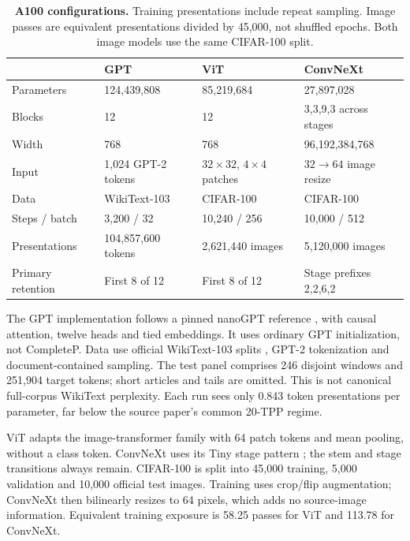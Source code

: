 \documentclass[10pt,letterpaper]{article}
\begin{document}
\begin{table}[h]
\centering\small
\caption{\textbf{A100 configurations.} Training presentations include repeat sampling. Image passes are equivalent presentations divided by 45,000, not shuffled epochs. Both image models use the same CIFAR-100 split.}
\label{tab:models}
\begin{tabularx}{\linewidth}{@{}lXXX@{}}\toprule
 & GPT & ViT & ConvNeXt\\\midrule
Parameters & 124,439,808 & 85,219,684 & 27,897,028\\
Blocks & 12 & 12 & 3,3,9,3 across stages\\
Width & 768 & 768 & 96,192,384,768\\
Input & 1,024 GPT-2 tokens & $32\!\times\!32$, $4\!\times\!4$ patches & $32\to64$ image resize\\
Data & WikiText-103 & CIFAR-100 & CIFAR-100\\
Steps / batch & 3,200 / 32 & 10,240 / 256 & 10,000 / 512\\
Presentations & 104,857,600 tokens & 2,621,440 images & 5,120,000 images\\
Primary retention & First 8 of 12 & First 8 of 12 & Stage prefixes 2,2,6,2\\\bottomrule
\end{tabularx}
\end{table}

The GPT implementation follows a pinned nanoGPT reference \citep{nanogpt}, with causal attention, twelve heads and tied embeddings. It uses ordinary GPT initialization, not CompleteP. Data use official WikiText-103 splits \citep{wikitext}, GPT-2 tokenization and document-contained sampling. The test panel comprises 246 disjoint windows and 251,904 target tokens; short articles and tails are omitted. This is not canonical full-corpus WikiText perplexity. Each run sees only 0.843 token presentations per parameter, far below the source paper's common 20-TPP regime.

ViT adapts the image-transformer family \citep{vit} with 64 patch tokens and mean pooling, without a class token. ConvNeXt uses its Tiny stage pattern \citep{convnext}; the stem and stage transitions always remain. CIFAR-100 \citep{cifar} is split into 45,000 training, 5,000 validation and 10,000 official test images. Training uses crop/flip augmentation; ConvNeXt then bilinearly resizes to 64 pixels, which adds no source-image information. Equivalent training exposure is 58.25 passes for ViT and 113.78 for ConvNeXt.
\end{document}
